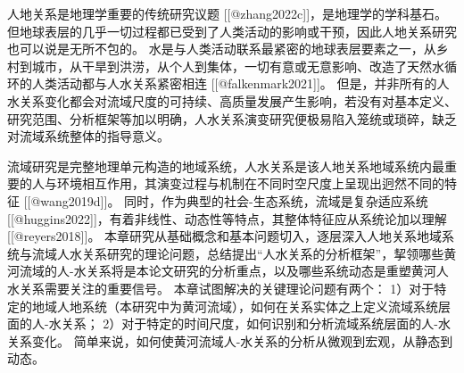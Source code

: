 
人地关系是地理学重要的传统研究议题 [[@zhang2022c]]，是地理学的学科基石。
但地球表层的几乎一切过程都已受到了人类活动的影响或干预，因此人地关系研究也可以说是无所不包的。
水是与人类活动联系最紧密的地球表层要素之一，从乡村到城市，从干旱到洪涝，从个人到集体，一切有意或无意影响、改造了天然水循环的人类活动都与人水关系紧密相连 [[@falkenmark2021]]。
但是，并非所有的人水关系变化都会对流域尺度的可持续、高质量发展产生影响，若没有对基本定义、研究范围、分析框架等加以明确，人水关系演变研究便极易陷入笼统或琐碎，缺乏对流域系统整体的指导意义。

流域研究是完整地理单元构造的地域系统，人水关系是该人地关系地域系统内最重要的人与环境相互作用，其演变过程与机制在不同时空尺度上呈现出迥然不同的特征 [[@wang2019d]]。
同时，作为典型的社会-生态系统，流域是复杂适应系统 [[@huggins2022]]，有着非线性、动态性等特点，其整体特征应从系统论加以理解 [[@reyers2018]]。
本章研究从基础概念和基本问题切入，逐层深入人地关系地域系统与流域人水关系研究的理论问题，总结提出“人水关系的分析框架”，挈领哪些黄河流域的人-水关系将是本论文研究的分析重点，以及哪些系统动态是重塑黄河人水关系需要关注的重要信号。
本章试图解决的关键理论问题有两个：
1）对于特定的地域人地系统（本研究中为黄河流域），如何在关系实体之上定义流域系统层面的人-水关系；
2）对于特定的时间尺度，如何识别和分析流域系统层面的人-水关系变化。
简单来说，如何使黄河流域人-水关系的分析从微观到宏观，从静态到动态。
